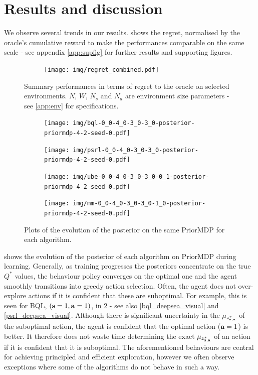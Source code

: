 \documentclass{article}
\begin{document}
\section{Results and discussion}

We observe several trends in our results.  shows the regret, normalised by the oracle's cumulative reward to make the performances comparable on the same scale - see appendix \ref{app:supfig} for further results and supporting figures.
\begin{figure}[h!]
\centering
\begin{subfigure}{1.\textwidth}
\texttt{[image: img/regret\_combined.pdf]}
\end{subfigure}
\captionsetup{width=0.9\linewidth}
\caption{Summary performances in terms of regret to the oracle on selected environments. $N$, $W$, $N_s$ and $N_a$ are environment size parameters - see \cref{app:env} for specifications.}\label{combined_regret_summary}
\end{figure}
\begin{figure}[h!]
\centering
\begin{subfigure}{0.49\textwidth}
\texttt{[image: img/bql-0\_0-4\_0-3\_0-3\_0-posterior-priormdp-4-2-seed-0.pdf]}
\end{subfigure}
\begin{subfigure}{0.49\textwidth}
\texttt{[image: img/psrl-0\_0-4\_0-3\_0-3\_0-posterior-priormdp-4-2-seed-0.pdf]}
\end{subfigure}
\begin{subfigure}{0.49\textwidth}
\texttt{[image: img/ube-0\_0-4\_0-3\_0-3\_0-0\_1-posterior-priormdp-4-2-seed-0.pdf]}
\end{subfigure}
\begin{subfigure}{0.49\textwidth}
\texttt{[image: img/mm-0\_0-4\_0-3\_0-3\_0-1\_0-posterior-priormdp-4-2-seed-0.pdf]}
\end{subfigure}
\captionsetup{width=0.9\linewidth}
\caption{Plots of the evolution of the posterior on the same PriorMDP for each algorithm.}\label{combined_posterior_evolution}
\end{figure}
 shows the evolution of the posterior of each algorithm on PriorMDP during learning. Generally, as training progresses the posteriors concentrate on the true $Q^*$ values, the behaviour policy converges on the optimal one and the agent smoothly transitions into greedy action selection. Often, the agent does not over-explore actions if it is confident that these are suboptimal. For example, this is seen for BQL, $(\mathbf{s} = 1, \mathbf{a} = 1)$, in \cref{combined_posterior_evolution} - see also \cref{bql_deepsea_visual} and \cref{psrl_deepsea_visual}. Although there is significant uncertainty in the $\mu_{z^*_{\mathbf{s}, \mathbf{a}}}$ of the suboptimal action, the agent is confident that the optimal action ($\mathbf{a} = 1$) is better. It therefore does not waste time determining the exact $\mu_{z^*_{\mathbf{s}, \mathbf{a}}}$ of an action if it is confident that it is suboptimal. The aforementioned behaviours are central for achieving principled and efficient exploration, however we often observe exceptions where some of the algorithms do not behave in such a way.
\end{document}
